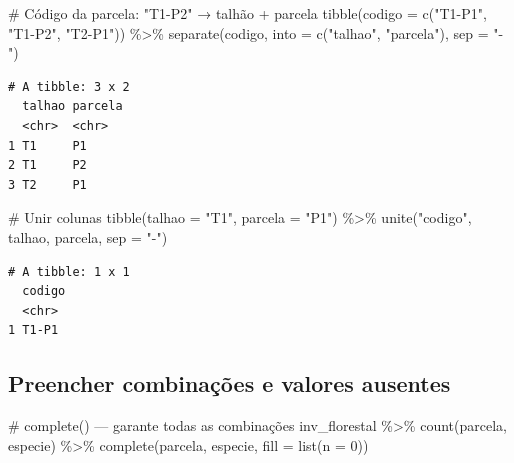 \documentclass[
  letterpaper,
]{scrbook}
\newenvironment{Shaded}{\begin{snugshade}}{\end{snugshade}}
\newcommand{\AttributeTok}[1]{\textcolor[rgb]{0.40,0.45,0.13}{#1}}
\newcommand{\CommentTok}[1]{\textcolor[rgb]{0.37,0.37,0.37}{#1}}
\newcommand{\DecValTok}[1]{\textcolor[rgb]{0.68,0.00,0.00}{#1}}
\newcommand{\FunctionTok}[1]{\textcolor[rgb]{0.28,0.35,0.67}{#1}}
\newcommand{\NormalTok}[1]{\textcolor[rgb]{0.00,0.23,0.31}{#1}}
\newcommand{\SpecialCharTok}[1]{\textcolor[rgb]{0.37,0.37,0.37}{#1}}
\newcommand{\StringTok}[1]{\textcolor[rgb]{0.13,0.47,0.30}{#1}}
\begin{document}
\begin{Shaded}
\begin{Highlighting}[]
\CommentTok{\# Código da parcela: "T1{-}P2" → talhão + parcela}
\FunctionTok{tibble}\NormalTok{(}\AttributeTok{codigo =} \FunctionTok{c}\NormalTok{(}\StringTok{"T1{-}P1"}\NormalTok{, }\StringTok{"T1{-}P2"}\NormalTok{, }\StringTok{"T2{-}P1"}\NormalTok{)) }\SpecialCharTok{\%\textgreater{}\%} 
  \FunctionTok{separate}\NormalTok{(codigo, }\AttributeTok{into =} \FunctionTok{c}\NormalTok{(}\StringTok{"talhao"}\NormalTok{, }\StringTok{"parcela"}\NormalTok{), }\AttributeTok{sep =} \StringTok{"{-}"}\NormalTok{)}
\end{Highlighting}
\end{Shaded}

\begin{verbatim}
# A tibble: 3 x 2
  talhao parcela
  <chr>  <chr>  
1 T1     P1     
2 T1     P2     
3 T2     P1     
\end{verbatim}

\begin{Shaded}
\begin{Highlighting}[]
\CommentTok{\# Unir colunas}
\FunctionTok{tibble}\NormalTok{(}\AttributeTok{talhao =} \StringTok{"T1"}\NormalTok{, }\AttributeTok{parcela =} \StringTok{"P1"}\NormalTok{) }\SpecialCharTok{\%\textgreater{}\%} 
  \FunctionTok{unite}\NormalTok{(}\StringTok{"codigo"}\NormalTok{, talhao, parcela, }\AttributeTok{sep =} \StringTok{"{-}"}\NormalTok{)}
\end{Highlighting}
\end{Shaded}

\begin{verbatim}
# A tibble: 1 x 1
  codigo
  <chr> 
1 T1-P1 
\end{verbatim}

\subsection{Preencher combinações e valores
ausentes}\label{preencher-combinauxe7uxf5es-e-valores-ausentes}

\begin{Shaded}
\begin{Highlighting}[]
\CommentTok{\# complete() — garante todas as combinações}
\NormalTok{inv\_florestal }\SpecialCharTok{\%\textgreater{}\%} 
  \FunctionTok{count}\NormalTok{(parcela, especie) }\SpecialCharTok{\%\textgreater{}\%} 
  \FunctionTok{complete}\NormalTok{(parcela, especie, }\AttributeTok{fill =} \FunctionTok{list}\NormalTok{(}\AttributeTok{n =} \DecValTok{0}\NormalTok{))}
\end{Highlighting}
\end{Shaded}
\end{document}
